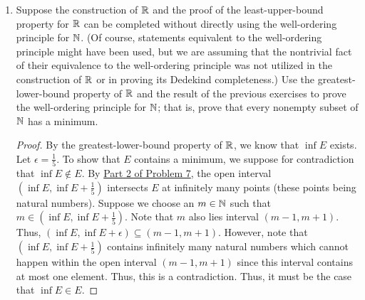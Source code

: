 \documentclass[11pt,a4paper]{article}
\begin{document}
\begin{enumerate}
\begin{enumerate}
\begin{proof}
    Now, we will show, through contradiction, that \( (\inf B, \inf B + \epsilon) \cap B \) contains infinitely many points. Suppose there exists an \( \epsilon > 0  \) such that \( (\inf B, \inf B + \epsilon) \cap B \) FINITELY many points. Denote these points by \( {b}_{i}  \) for \( 1 \leq i \leq n  \) in
    \[  (\inf B, \inf B + \epsilon) \cap B = \{ {b}_{i} : 1 \leq i \leq n   \}  \]
    For all \( 1 \leq k \leq n  \), let \( {d}_{k } = | \inf B - {b}_{k } |  \). Since \( {b}_{k } \in B  \) and \( \inf B \notin  B  \), we must have \( | \inf B - {b}_{k } | > 0  \). Let 
    \[  d = \frac{ \min \{ {d}_{1}, {d}_{2}, \dots, {d}_{n} \}  }{ 2 }. \]
    But this implies that none of the \( {b}_{i} \) for \( 1 \leq i \leq n   \) lies within the open interval \( (\inf B , \inf B + d) \). That is, the set 
    \[  (\inf B , \inf B + d) \cap B = \emptyset \]
    which is a contradiction. Thus, the open interval \( (\inf B, \inf B + \epsilon) \) must have infinitely many points.
    \end{proof}
\end{enumerate}

\item Suppose the construction of \( \mathbb{R}  \) and the proof of the least-upper-bound property for \( \mathbb{R}  \) can be completed without directly using the well-ordering principle for \( \mathbb{N}  \). (Of course, statements equivalent to the well-ordering principle might have been used, but we are assuming that the nontrivial fact of their equivalence to the well-ordering principle was not utilized in the construction of \( \mathbb{R}  \) or in proving its Dedekind completeness.) Use the greatest-lower-bound property of \( \mathbb{R}  \) and the result of the previous exercises to prove the well-ordering principle for \( \mathbb{N}  \); that is, prove that every nonempty subset of \( \mathbb{N}  \) has a minimum.
    \begin{proof}
    By the greatest-lower-bound property of \( \mathbb{R}  \), we know that \( \inf E  \) exists.
    Let \( \epsilon = \frac{ 1 }{ 5 }   \). To show that \( E  \) contains a minimum, we suppose for contradiction that \( \inf E \notin E  \). By {\hyperref[Problem 2]{Part 2 of Problem 7}}, the open interval \( (\inf E, \inf E + \frac{ 1 }{ 5 } ) \) intersects \( E  \) at infinitely many points (these points being natural numbers). Suppose we choose an \( m \in \mathbb{N} \) such that \( m  \in (\inf E , \inf E + \frac{ 1 }{ 5 }  ) \).  Note that \( m  \) also lies interval \( (m - 1, m + 1) \). Thus, \( (\inf E, \inf E + \epsilon) \subseteq (m-1,m+1) \). However, note that \( (\inf E, \inf E + \frac{ 1 }{ 5 }) \) contains infinitely many natural numbers which cannot happen within the open interval \( (m-1,m+1) \) since this interval contains at most one element. Thus, this is a contradiction. Thus, it must be the case that \( \inf E \in E  \).
\end{proof}


\end{enumerate}
\end{document}
